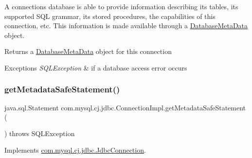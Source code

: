 A connection\textquotesingle{}s database is able to provide information describing its tables, its supported S\+QL grammar, its stored procedures, the capabilities of this connection, etc. This information is made available through a \mbox{\hyperlink{classcom_1_1mysql_1_1cj_1_1jdbc_1_1_database_meta_data}{Database\+Meta\+Data}} object.

\begin{DoxyReturn}{Returns}
a \mbox{\hyperlink{classcom_1_1mysql_1_1cj_1_1jdbc_1_1_database_meta_data}{Database\+Meta\+Data}} object for this connection 
\end{DoxyReturn}

\begin{DoxyExceptions}{Exceptions}
{\em S\+Q\+L\+Exception} & if a database access error occurs \\
\hline
\end{DoxyExceptions}
\mbox{\label{classcom_1_1mysql_1_1cj_1_1jdbc_1_1_connection_impl_a66f6e72ea3c8a1db920f4fe5f736b4c9}} 
\subsubsection{\texorpdfstring{get\+Metadata\+Safe\+Statement()}{getMetadataSafeStatement()}\hspace{0.1cm}{\footnotesize\ttfamily [1/2]}}
{\footnotesize\ttfamily java.\+sql.\+Statement com.\+mysql.\+cj.\+jdbc.\+Connection\+Impl.\+get\+Metadata\+Safe\+Statement (\begin{DoxyParamCaption}{ }\end{DoxyParamCaption}) throws S\+Q\+L\+Exception}



Implements \mbox{\hyperlink{interfacecom_1_1mysql_1_1cj_1_1jdbc_1_1_jdbc_connection_ab48793a6beae119da08e7ae9e982c6c0}{com.\+mysql.\+cj.\+jdbc.\+Jdbc\+Connection}}.

\mbox{\label{classcom_1_1mysql_1_1cj_1_1jdbc_1_1_connection_impl_ae2f79574cde7e93df85c06f092230bc8}} 

